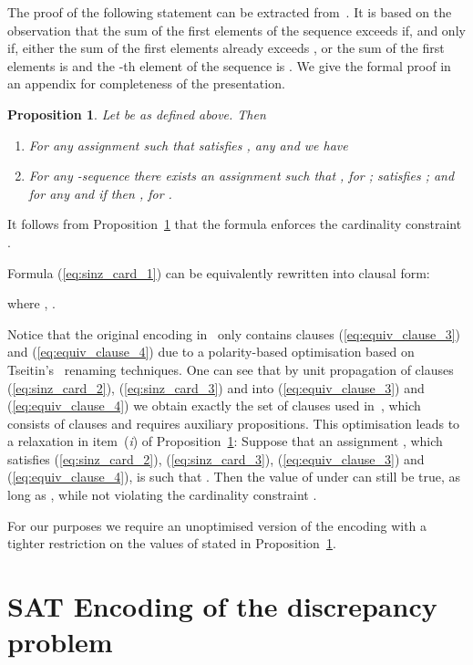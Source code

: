 \documentclass{article} \usepackage[utf8]{inputenc}
\newtheorem{proposition}[theorem]{Proposition}
\begin{document}
The proof of the following statement can be extracted from~\cite{Sinz05}. 
It is based on the observation that the sum of the first  elements of the  sequence
 exceeds  if, and only if, either the sum of the first 
 elements already exceeds , or the sum of the first  elements is  and 
the -th element of the sequence is .
We give the formal proof in an appendix for completeness of the presentation.
\begin{proposition}\label{prop:sinz}
Let  be as defined above.  Then 
\begin{enumerate}
\item[(i)] For any assignment  such that  satisfies ,
any  and 
we have 

\item[(ii)] For any -sequence   
 there exists an assignment  such that 
  , for ;
   satisfies ; and 
  for any  and  if  then , for .
\end{enumerate}
\end{proposition}
It follows from Proposition~\ref{prop:sinz} that the formula
 enforces the cardinality
constraint . 

Formula (\ref{eq:sinz_card_1}) can be equivalently rewritten into clausal form:

{where , }.

\smallskip

Notice that the original encoding in~\cite{Sinz05} only contains clauses
(\ref{eq:equiv_clause_3}) and (\ref{eq:equiv_clause_4}) due to a 
polarity-based optimisation based on Tseitin's~ renaming techniques.
One can see that
by unit propagation of clauses (\ref{eq:sinz_card_2}), (\ref{eq:sinz_card_3}) and
 into (\ref{eq:equiv_clause_3}) and
(\ref{eq:equiv_clause_4}) we obtain exactly the set of clauses used
in~\cite{Sinz05}, which consists of  clauses and requires 
auxiliary propositions. 
This optimisation leads to a relaxation in
item~(\textit{i}) of Proposition~\ref{prop:sinz}: Suppose that an assignment
, which
satisfies 
(\ref{eq:sinz_card_2}),
(\ref{eq:sinz_card_3}),
(\ref{eq:equiv_clause_3}) and
(\ref{eq:equiv_clause_4}),
is such that .  Then the value of
 under  can still be true, as long as , while not
violating the cardinality constraint .  

For our purposes we require an unoptimised version of the encoding with 
a tighter restriction on the values of  stated in Proposition~\ref{prop:sinz}.





\section{SAT Encoding of the discrepancy problem}\label{sec:encoding}
\end{document}
